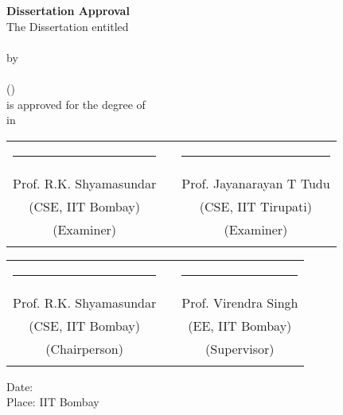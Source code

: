 \thispagestyle{empty}
\begin{center}
{\LARGE \bf Dissertation Approval}\\[0.5in]
{\large The Dissertation entitled}\\[0.2in]
{\bf\expandafter{\LARGE \Title}}\\[0.2in]
{\large by}\\[0.2in]
{\Large \bf \Author}\\
{\Large (\Rollnum)}\\[0.2in]
{\large is approved for the degree of} \\[0.2in]
{\large \Degree in \Dept} \\[0.8in]

\begin{tabular}{ccc}
\rule{6cm}{1sp} & \rule{10mm}{0pt} & \rule{6cm}{1sp} \\
{\large Prof. R.K. Shyamasundar}     & & {\large Prof. Jayanarayan T Tudu} \\
{\normalsize (CSE, IIT Bombay)}     & & {\normalsize (CSE, IIT Tirupati)} \\
{\normalsize (Examiner)}     & & {\normalsize (Examiner)} \\[0.4in]\\
\end{tabular}

\begin{tabular}{ccc}
\rule{6cm}{1sp} & \rule{10mm}{0pt} & \rule{6cm}{1sp} \\
{\large Prof. R.K. Shyamasundar}     & & {\large Prof. Virendra Singh} \\
{\normalsize (CSE, IIT Bombay)}     & & {\normalsize (EE, IIT Bombay)}\\
{\normalsize (Chairperson)}     & & {\normalsize (Supervisor)} \\[0.4in]\\
\end{tabular}

\end{center}
{\large Date:} \Date\\[0.1in]
{\large Place:} IIT Bombay
